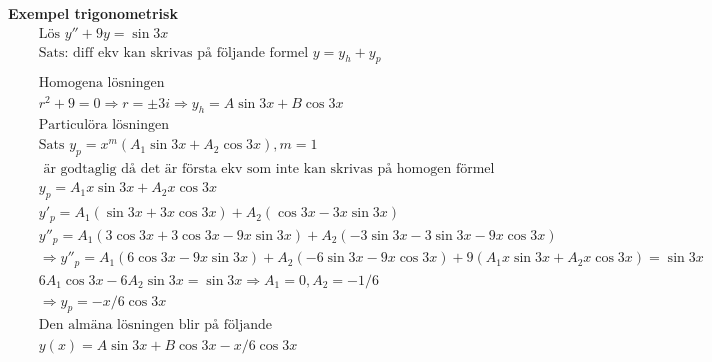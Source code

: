 \textbf{Exempel trigonometrisk}
\begin{align*} %
  &\quad  \text{Lös } y'' + 9y = \sin{3x}  \\
  &\quad  \text{Sats: diff ekv kan skrivas på följande formel } y=y_h+y_p \\
  &\quad  \\
  &\quad  \text{Homogena lösningen } \\
  &\quad  r^2+9=0 \Rightarrow r=\pm3i \Rightarrow y_h=A\sin{3x} + B\cos{3x}
  &\quad  \\
  &\quad  \text{Particulöra lösningen } \\
  &\quad  \text{Sats } y_p=x^m(A_1\sin{3x}+A_2\cos{3x}), m=1 \\
  &\quad  \text{ är godtaglig då det är första ekv som inte kan skrivas på homogen förmel} \\
  &\quad  y_p=A_1x\sin{3x}+A_2x\cos{3x} \\
  &\quad  y'_p=A_1(\sin{3x}+3x\cos{3x}) + A_2(\cos{3x}-3x\sin{3x}) \\
  &\quad  y''_p=A_1(3\cos{3x}+3\cos{3x}-9x\sin{3x}) + A_2(-3\sin{3x}-3\sin{3x}-9x\cos{3x}) \\
  &\quad  \Rightarrow y''_p=A_1(6\cos{3x}-9x\sin{3x}) + A_2(-6\sin{3x}-9x\cos{3x})
  + 9(A_1x\sin{3x}+A_2x\cos{3x}) = \sin{3x} \\
  &\quad  6A_1\cos{3x} - 6A_2\sin{3x} = \sin{3x} \Rightarrow A_1=0, A_2=-1/6 \\
  &\quad  \Rightarrow y_p = -x/6 \cos{3x}
  &\quad  \\
  &\quad  \text{Den almäna lösningen blir på följande } \\
  &\quad  y(x)= A\sin{3x}+B\cos{3x} -x/6 \cos{3x} \\
\end{align*}

